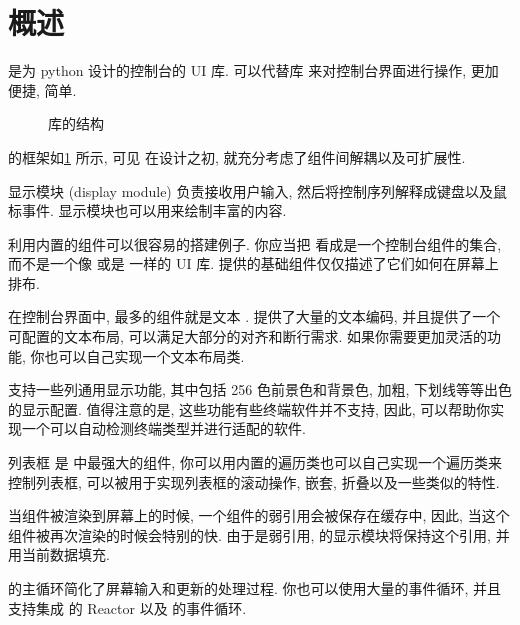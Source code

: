 \section{\urwid{} 概述}
\indent\urwid{} 是为 python 设计的控制台的 UI 库. \urwid{} 可以代替库  来对控制台界面进行操作, 更加便捷, 简单.%
%
\begin{figure}[!htb]
    \centering
    
    \caption{\urwid{} 库的结构}
    \label{fig:structure_of_urwid_library}
\end{figure}%
%
\urwid{} 的框架如\cref{fig:structure_of_urwid_library} 所示, 可见 \urwid{} 在设计之初, 就充分考虑了组件间解耦以及可扩展性.

显示模块 (display module) 负责接收用户输入, 然后将控制序列解释成键盘以及鼠标事件. 显示模块也可以用来绘制丰富的内容.

利用内置的组件可以很容易的搭建例子. 你应当把 \urwid{} 看成是一个控制台组件的集合, 而不是一个像  或是  一样的 UI 库. \urwid{} 提供的基础组件仅仅描述了它们如何在屏幕上排布.

在控制台界面中, 最多的组件就是文本 . \urwid{} 提供了大量的文本编码, 并且提供了一个可配置的文本布局, 可以满足大部分的对齐和断行需求. 如果你需要更加灵活的功能, 你也可以自己实现一个文本布局类.

\urwid{} 支持一些列通用显示功能, 其中包括 256 色前景色和背景色, 加粗, 下划线等等出色的显示配置. 值得注意的是, 这些功能有些终端软件并不支持, 因此, \urwid{} 可以帮助你实现一个可以自动检测终端类型并进行适配的软件.

列表框  是 \urwid{} 中最强大的组件, 你可以用内置的遍历类也可以自己实现一个遍历类来控制列表框, 可以被用于实现列表框的滚动操作, 嵌套, 折叠以及一些类似的特性.

当组件被渲染到屏幕上的时候, 一个组件的弱引用会被保存在缓存中, 因此, 当这个组件被再次渲染的时候会特别的快. 由于是弱引用, \urwid{} 的显示模块将保持这个引用, 并用当前数据填充.

\urwid{} 的主循环简化了屏幕输入和更新的处理过程. 你也可以使用大量的事件循环, 并且支持集成  的 Reactor 以及  的事件循环.